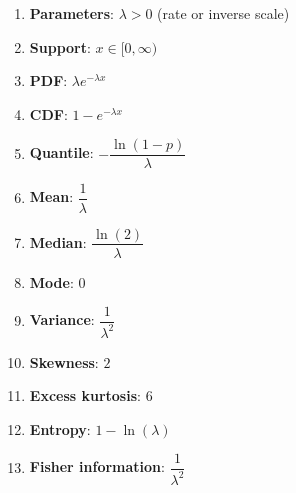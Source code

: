 \begin{enumerate}
    \item \textbf{Parameters}: ${\displaystyle \lambda >0}$ (rate or inverse scale)
    \hfill \cite{wiki/Exponential_distribution, statistics/book/Statistics-for-Data-Scientists/Maurits-Kaptein}

    \item \textbf{Support}: ${\displaystyle x\in [0,\infty )}$
    \hfill \cite{wiki/Exponential_distribution, statistics/book/Statistics-for-Data-Scientists/Maurits-Kaptein}

    \item \textbf{PDF}:
    ${\displaystyle \lambda e^{-\lambda x}}$
    \hfill \cite{wiki/Exponential_distribution, statistics/book/Statistics-for-Data-Scientists/Maurits-Kaptein}

    \item \textbf{CDF}: ${\displaystyle 1-e^{-\lambda x}}$
    \hfill \cite{wiki/Exponential_distribution}

    \item \textbf{Quantile}: ${\displaystyle -{\dfrac {\ln(1-p)}{\lambda }}}$
    \hfill \cite{wiki/Exponential_distribution}

    \item \textbf{Mean}: $\dfrac{1}{\lambda}$
    \hfill \cite{wiki/Exponential_distribution}

    \item \textbf{Median}: $\dfrac{\ln(2)}{\lambda}$
    \hfill \cite{wiki/Exponential_distribution}

    \item \textbf{Mode}: $0$
    \hfill \cite{wiki/Exponential_distribution}

    \item \textbf{Variance}: $\dfrac{1}{\lambda^2}$
    \hfill \cite{wiki/Exponential_distribution}

    \item \textbf{Skewness}: $2$
    \hfill \cite{wiki/Exponential_distribution}

    \item \textbf{Excess kurtosis}: $6$
    \hfill \cite{wiki/Exponential_distribution}

    \item \textbf{Entropy}: $1-\ln(\lambda)$
    \hfill \cite{wiki/Exponential_distribution}

    \item \textbf{Fisher information}: $\dfrac{1}{\lambda^2}$
    \hfill \cite{wiki/Exponential_distribution}


\end{enumerate}
